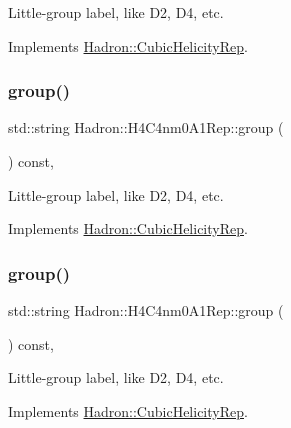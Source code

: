 Little-\/group label, like D2, D4, etc. 

Implements \mbox{\hyperlink{structHadron_1_1CubicHelicityRep_a101a7d76cd8ccdad0f272db44b766113}{Hadron\+::\+Cubic\+Helicity\+Rep}}.

\mbox{\label{structHadron_1_1H4C4nm0A1Rep_ac03a34ff386fa824b479f98878531f7b}} 
\subsubsection{\texorpdfstring{group()}{group()}\hspace{0.1cm}{\footnotesize\ttfamily [3/5]}}
{\footnotesize\ttfamily std\+::string Hadron\+::\+H4\+C4nm0\+A1\+Rep\+::group (\begin{DoxyParamCaption}{ }\end{DoxyParamCaption}) const\hspace{0.3cm}{\ttfamily [inline]}, {\ttfamily [virtual]}}

Little-\/group label, like D2, D4, etc. 

Implements \mbox{\hyperlink{structHadron_1_1CubicHelicityRep_a101a7d76cd8ccdad0f272db44b766113}{Hadron\+::\+Cubic\+Helicity\+Rep}}.

\mbox{\label{structHadron_1_1H4C4nm0A1Rep_ac03a34ff386fa824b479f98878531f7b}} 
\subsubsection{\texorpdfstring{group()}{group()}\hspace{0.1cm}{\footnotesize\ttfamily [4/5]}}
{\footnotesize\ttfamily std\+::string Hadron\+::\+H4\+C4nm0\+A1\+Rep\+::group (\begin{DoxyParamCaption}{ }\end{DoxyParamCaption}) const\hspace{0.3cm}{\ttfamily [inline]}, {\ttfamily [virtual]}}

Little-\/group label, like D2, D4, etc. 

Implements \mbox{\hyperlink{structHadron_1_1CubicHelicityRep_a101a7d76cd8ccdad0f272db44b766113}{Hadron\+::\+Cubic\+Helicity\+Rep}}.

